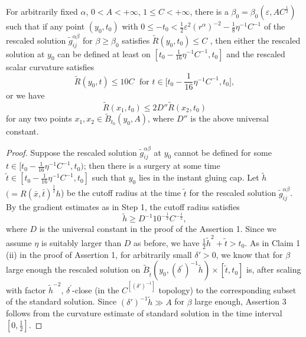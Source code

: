 \begin{lemma}
  \label{lem:cz-backward-control-or-capwise-comparability}
For arbitrarily fixed $\alpha$,
$0<A<+\infty$, $1 \leq C<+\infty$, there is a
$\beta_0=\beta_0(\varepsilon, AC^{\frac{1}{2}})$ such that if any
point $(y_0,t_0)$  with  $0 \leq -t_0 <\frac{1}{2}\varepsilon^2
(r^{\alpha})^{-2}- \frac{1}{8}\eta^{-1}C^{-1}$ of the rescaled
solution $\widetilde{g}^{\alpha\beta}_{ij}$ for $\beta\geq\beta_0$
satisfies $\widetilde{R}(y_0,t_0)\leq C$ , then either the
rescaled solution at $y_0$ can be defined at least on
$[t_0-\frac{1}{16}\eta^{-1}C^{-1},t_0]$ and the rescaled scalar
curvature satisfies
$$
\widetilde{R}(y_0,t)\leq 10 {C} \; \mbox{ for } t\in
\Big[t_0-\frac{1}{16}\eta^{-1}C^{-1},t_0\Big],
$$
or we have
$$
\widetilde{R}(x_1,t_0)\leq 2D'' \widetilde{R}(x_2,t_0)
$$
for any two points $x_1, x_2\in \widetilde{B}_{t_0}(y_0,A)$, where
$D''$ is the above universal constant.

\end{lemma}
\begin{proof}
Suppose the rescaled
solution $\widetilde{g}^{\alpha\beta}_{ij}$ at $y_0$ cannot be
defined for some $t\in [t_0-\frac{1}{16}\eta^{-1}C^{-1},t_0)$;
then there is a surgery at some time $\tilde{t} \in
[t_0-\frac{1}{16}\eta^{-1}C^{-1},t_0]$ such that $y_0 $ lies in
the instant gluing cap. Let $\tilde{h}$
$(=R(\bar{x},\bar{t})^{\frac{1}{2}}h$) be the cutoff radius at the
time $\tilde{t}$ for the rescaled solution
$\widetilde{g}^{\alpha\beta}_{ij}$.  By the gradient estimates as
in Step 1, the cutoff radius satisfies
$$
\tilde{h} \geq D^{-1}10^{-\frac{1}{2}}C^{-\frac{1}{2}},
$$
where $D$ is the universal constant in the proof of the Assertion
1. Since we assume $\eta$ is suitably larger than $D$ as before,
we have $\frac{1}{2}\tilde{h}^{2} +\tilde{t}>t_0$. As in Claim 1
(ii) in the proof of Assertion 1, for arbitrarily small
$\delta'>0$, we know that for $\beta$ large enough the rescaled
solution on
$\widetilde{B}_{\tilde{t}}(y_0,{(\delta^{\prime})}^{-1}\tilde{h})\times
[\tilde{t},t_0]$ is, after scaling with factor $\tilde{h}^{-2}$,
${\delta}^{\prime}$-close (in the $C^{[(\delta')^{-1}]}$ topology)
to the corresponding subset of the standard solution. Since
$(\delta')^{-1}\tilde{h}\gg A$ for $\beta$ large enough, Assertion
3 follows from the curvature estimate of standard solution in the
time interval $ [0,\frac{1}{2}]$.

\end{proof}

